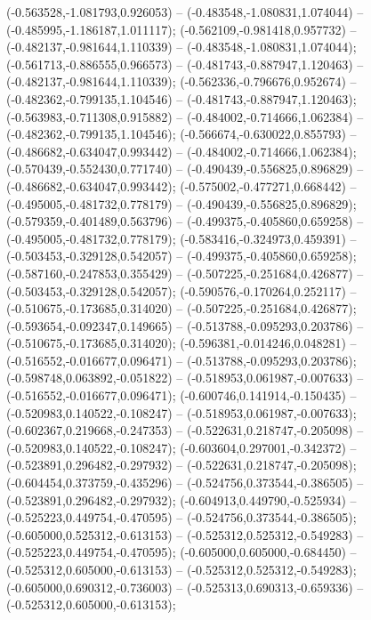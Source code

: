  (-0.563528,-1.081793,0.926053) -- (-0.483548,-1.080831,1.074044) -- (-0.485995,-1.186187,1.011117);
 (-0.562109,-0.981418,0.957732) -- (-0.482137,-0.981644,1.110339) -- (-0.483548,-1.080831,1.074044);
 (-0.561713,-0.886555,0.966573) -- (-0.481743,-0.887947,1.120463) -- (-0.482137,-0.981644,1.110339);
 (-0.562336,-0.796676,0.952674) -- (-0.482362,-0.799135,1.104546) -- (-0.481743,-0.887947,1.120463);
 (-0.563983,-0.711308,0.915882) -- (-0.484002,-0.714666,1.062384) -- (-0.482362,-0.799135,1.104546);
 (-0.566674,-0.630022,0.855793) -- (-0.486682,-0.634047,0.993442) -- (-0.484002,-0.714666,1.062384);
 (-0.570439,-0.552430,0.771740) -- (-0.490439,-0.556825,0.896829) -- (-0.486682,-0.634047,0.993442);
 (-0.575002,-0.477271,0.668442) -- (-0.495005,-0.481732,0.778179) -- (-0.490439,-0.556825,0.896829);
 (-0.579359,-0.401489,0.563796) -- (-0.499375,-0.405860,0.659258) -- (-0.495005,-0.481732,0.778179);
 (-0.583416,-0.324973,0.459391) -- (-0.503453,-0.329128,0.542057) -- (-0.499375,-0.405860,0.659258);
 (-0.587160,-0.247853,0.355429) -- (-0.507225,-0.251684,0.426877) -- (-0.503453,-0.329128,0.542057);
 (-0.590576,-0.170264,0.252117) -- (-0.510675,-0.173685,0.314020) -- (-0.507225,-0.251684,0.426877);
 (-0.593654,-0.092347,0.149665) -- (-0.513788,-0.095293,0.203786) -- (-0.510675,-0.173685,0.314020);
 (-0.596381,-0.014246,0.048281) -- (-0.516552,-0.016677,0.096471) -- (-0.513788,-0.095293,0.203786);
 (-0.598748,0.063892,-0.051822) -- (-0.518953,0.061987,-0.007633) -- (-0.516552,-0.016677,0.096471);
 (-0.600746,0.141914,-0.150435) -- (-0.520983,0.140522,-0.108247) -- (-0.518953,0.061987,-0.007633);
 (-0.602367,0.219668,-0.247353) -- (-0.522631,0.218747,-0.205098) -- (-0.520983,0.140522,-0.108247);
 (-0.603604,0.297001,-0.342372) -- (-0.523891,0.296482,-0.297932) -- (-0.522631,0.218747,-0.205098);
 (-0.604454,0.373759,-0.435296) -- (-0.524756,0.373544,-0.386505) -- (-0.523891,0.296482,-0.297932);
 (-0.604913,0.449790,-0.525934) -- (-0.525223,0.449754,-0.470595) -- (-0.524756,0.373544,-0.386505);
 (-0.605000,0.525312,-0.613153) -- (-0.525312,0.525312,-0.549283) -- (-0.525223,0.449754,-0.470595);
 (-0.605000,0.605000,-0.684450) -- (-0.525312,0.605000,-0.613153) -- (-0.525312,0.525312,-0.549283);
 (-0.605000,0.690312,-0.736003) -- (-0.525313,0.690313,-0.659336) -- (-0.525312,0.605000,-0.613153);
